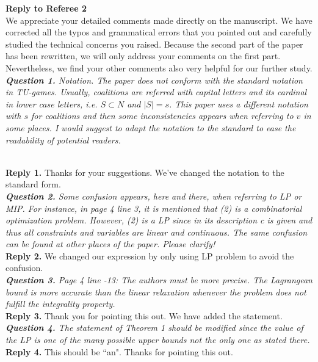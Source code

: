 \documentclass[11pt]{article}
\begin{document}
\noindent \textbf{\large Reply to Referee 2}
\\[3mm]
We appreciate your detailed comments made directly on the manuscript.
We have corrected all the typos and grammatical errors that you pointed out and carefully studied the technical concerns you raised.
Because the second part of the paper has been rewritten, we will only address your comments on the first part.
Nevertheless, we find your other comments also very helpful for our further study.
\\[4mm]
%
%
%
%
\noindent \textit{\textbf{Question 1.}
Notation. The paper does not conform with the standard notation in
TU-games. Usually, coalitions are referred with capital letters and its
cardinal in lower case letters, i.e. $S \subset N$ and $|S| = s$. This paper uses a different notation with $s$ for coalitions and then some inconsistencies
appears when referring to $v$ in some places. I would suggest to adapt
the notation to the standard to ease the readability of potential readers.}

\\[2mm]
\noindent \textbf{Reply 1.}
Thanks for your suggestions.
We've changed the notation to the standard form.
\\[4mm]
%
%
%
\noindent \textit{\textbf{Question 2.}
Some confusion appears, here and there, when referring to LP or MIP.
For instance, in page 4 line 3, it is mentioned that (2) is a combinatorial
optimization problem. However, (2) is a LP since in its description c is
given and thus all constraints and variables are linear and continuous.
The same confusion can be found at other places of the paper. Please
clarify!}
\\[2mm]
\noindent \textbf{Reply 2.}
We changed our expression by only using LP problem to avoid the confusion.
\\[4mm]
%
%
%
\noindent \textit{\textbf{Question 3.}
Page 4 line -13: The authors must be more precise. The Lagrangean
bound is more accurate than the linear relaxation whenever the problem does not fulfill the integrality property.
}
\\[2mm]
\noindent \textbf{Reply 3.}
Thank you for pointing this out.
We have added the statement.
\\[4mm]
%
%
%
\noindent \textit{\textbf{Question 4.}
The statement of Theorem 1 should be modified since the value of the
LP is one of the many possible upper bounds not the only one as stated
there.
}
\\[2mm]
\noinden \textbf{Reply 4.}
This should be ``an". Thanks for pointing this out.
\end{document}
